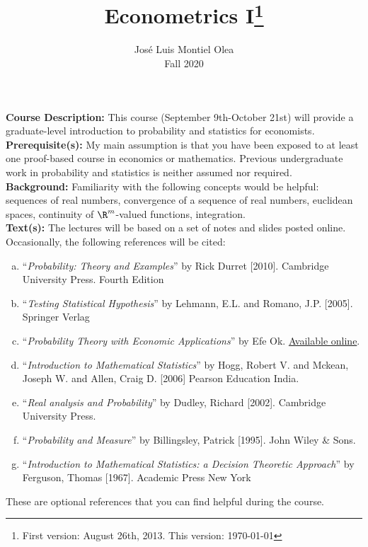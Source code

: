 \documentclass[11pt]{article}
\title {Econometrics I\thanks{First version: August 26th, 2013. This version: \today} }
\author {Jos\'e Luis Montiel Olea \protect\\
Fall 2020
}
\date{}
\begin{document}
\onehalfspace
\maketitle


\noindent \textbf{Course Description:} This course (September 9th-October 21st) will provide a graduate-level introduction to probability and statistics for economists.\\ 

\noindent \textbf{Prerequisite(s):} My main assumption is that you have been exposed to at least one proof-based course in economics or mathematics. Previous undergraduate work in probability and statistics is neither assumed nor required. \\ 

\noindent \textbf{Background:} Familiarity with the following concepts would be helpful: sequences of real numbers, convergence of a sequence of real numbers, euclidean spaces,  continuity of $\R^m$-valued functions, integration. \\

\noindent \textbf{Text(s):} The lectures will be based on a set of notes and slides posted online. Occasionally, the following references will be cited:

\begin{enumerate}[a)]
\item ``\emph{Probability: Theory and Examples}'' by Rick Durret [2010]. Cambridge University Press. Fourth Edition
\item ``\emph{Testing Statistical Hypothesis}'' by Lehmann, E.L. and Romano, J.P. [2005]. Springer Verlag
\item ``\emph{Probability Theory with Economic Applications}'' by Efe Ok. \href{https://files.nyu.edu/eo1/public/books.html}{Available online}.
\item ``\emph{Introduction to Mathematical Statistics}'' by Hogg, Robert V. and Mckean, Joseph W. and Allen, Craig D. [2006] Pearson Education India. 
\item ``\emph{Real analysis and Probability}'' by Dudley, Richard [2002]. Cambridge University Press. 
\item ``\emph{Probability and Measure}'' by Billingsley, Patrick [1995]. John Wiley \& Sons. 
\item ``\emph{Introduction to Mathematical Statistics: a Decision Theoretic Approach}'' by Ferguson, Thomas [1967]. Academic Press New York
\end{enumerate}
\noindent These are optional references that you can find helpful during the course.  \\
\end{document}
